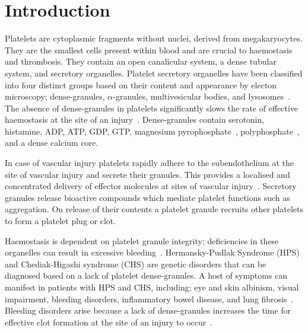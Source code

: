 \section{Introduction}
\label{platelets:introduction}
Platelets are cytoplasmic fragments without nuclei, derived from megakaryocytes. They are the smallest cells present within blood and are crucial to haemostasis and thrombosis. They contain an open canalicular system, a dense tubular system, and secretory organelles. Platelet secretory organelles have been classified into four distinct groups based on their content and appearance by electon microscopy; dense-granules, $\alpha$-granules, multivesicular bodies, and lysosomes~\cite{VanNispenTotPannerden2010}. The absence of dense-granules in platelets significantly slows the rate of effective haemostasis at the site of an injury~\cite{Seward2013}. Dense-granules contain serotonin, histamine, ADP, ATP, GDP, GTP, magnesium pyrophosphate~\cite{Rendu2001}, polyphosphate~\cite{Ruiz2004}, and a dense calcium core.

In case of vascular injury platelets rapidly adhere to the subendothelium at the site of vascular injury and secrete their granules. This provides a localised and concentrated delivery of effector molecules at sites of vascular injury~\cite{Reed2000}. Secretory granules release bioactive compounds which mediate platelet functions such as aggregation. On release of their contents a platelet granule recruits other platelets to form a platelet plug or clot.

Haemostasis is dependent on platelet granule integrity; deficiencies in these organelles can result in excessive bleeding~\cite{Nurden2014}. Hermansky-Pudlak Syndrome (HPS) and Chediak-Higashi syndrome (CHS) are genetic disorders that can be diagnosed based on a lack of platelet dense-granules. A host of symptoms can manifest in patients with HPS and CHS, including; eye and skin albinism, visual impairment, bleeding disorders, inflammatory bowel disease, and lung fibrosis~\cite{Wei2006}. Bleeding disorders arise because a lack of dense-granules increases the time for effective clot formation at the site of an injury to occur~\cite{Seward2013}.

